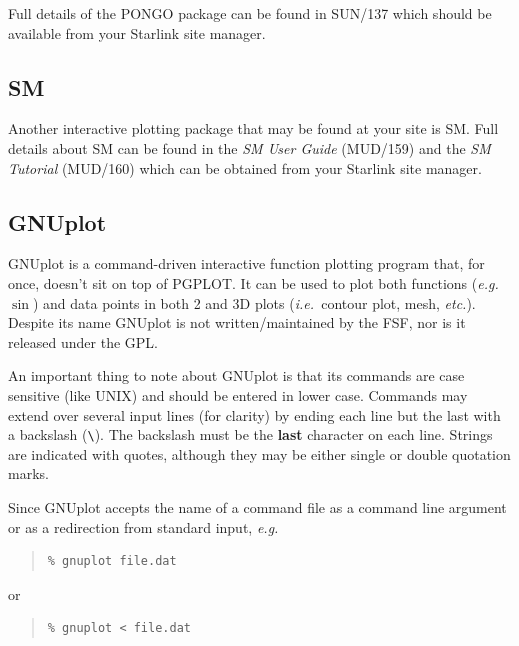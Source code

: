 \documentclass[twoside,11pt]{article}
\newcommand{\htmladdnormallink}[2]{#1}
\newcommand{\htmlref}[2]{#1}
\newcommand{\xref}[3]{#1}
\newcommand{\xlabel}[1]{}
\begin{document}
Full details of the PONGO package can be found in
\xref{SUN/137}{sun137}{} which should be available from your Starlink
site manager.

\subsection{\xlabel{sc15_sm}SM\label{sc15_sm}}

Another interactive plotting package that may be found at your site is
SM. Full details about SM can be found in the {\em SM User Guide}
(MUD/159) and the {\em SM Tutorial} (MUD/160) which can be obtained
from your Starlink site manager.

\subsection{\xlabel{sc15_gnuplot}GNUplot\label{sc15_gnuplot}}

\htmladdnormallink{GNUplot}{http://www.cs.dartmouth.edu/gnuplot_info.html}
is a command-driven interactive function plotting program that, for
once, doesn't sit on top of \htmlref{PGPLOT}{sc15_pgplot}. It can be
used to plot both functions ({\em e.g.\ }$\sin$) and data points in
both 2 and 3D plots ({\em i.e.\ }contour plot, mesh, {\em etc.}).
Despite its name GNUplot is not written/maintained by the FSF, nor is
it released under the GPL.

An important thing to note about GNUplot is that its commands are case
sensitive (like UNIX) and should be entered in lower case. Commands
may extend over several input lines (for clarity) by ending each line
but the last with a backslash (\verb+\+). The backslash must be the
{\bf last} character on each line. Strings are indicated with quotes,
although they may be either single or double quotation marks.

Since GNUplot accepts the name of a command file as a command line
argument or as a redirection from standard input, {\em e.g.\ }

\small
\begin{quote}
\begin{verbatim}
% gnuplot file.dat
\end{verbatim}
\end{quote}
\normalsize

or

\small
\begin{quote}
\begin{verbatim}
% gnuplot < file.dat
\end{verbatim}
\end{quote}
\normalsize
\end{document}
